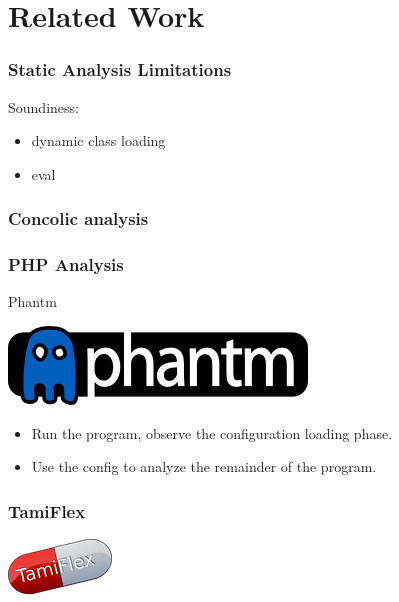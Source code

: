 \documentclass{beamer}
\begin{document}
\section{Related Work}

\begin{frame}
  \frametitle{Static Analysis Limitations}
Soundiness:
\begin{itemize}
\item dynamic class loading
\item eval
\end{itemize}
\end{frame}


\begin{frame}
  \frametitle{Concolic analysis}
\end{frame}

\begin{frame}
  \frametitle{PHP Analysis}

Phantm
\begin{center}
\includegraphics[width=\textwidth]{images/phantm-blue-solid.png}
\end{center}
\begin{itemize}
\item Run the program, observe the configuration loading phase.
\item Use the config to analyze the remainder of the program.
\end{itemize}
\end{frame}

\begin{frame}
  \frametitle{TamiFlex}

\begin{center}
\includegraphics[width=\textwidth]{images/tamiflex.png}
\end{center}
\end{frame}
\end{document}
